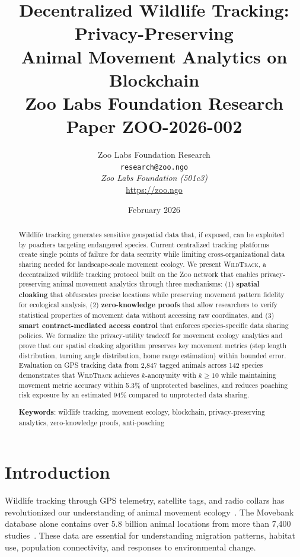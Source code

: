 \documentclass[11pt,letterpaper]{article}
\title{\textbf{Decentralized Wildlife Tracking: Privacy-Preserving\\Animal Movement Analytics on Blockchain}\\
\large Zoo Labs Foundation Research Paper ZOO-2026-002}
\author{
Zoo Labs Foundation Research\\
\texttt{research@zoo.ngo}\\[6pt]
\textit{Zoo Labs Foundation (501c3)}\\
\url{https://zoo.ngo}
}
\date{February 2026}
\newcommand{\Zoo}{\textsc{Zoo}}
\newcommand{\WildTrack}{\textsc{WildTrack}}
\begin{document}
\maketitle

\begin{abstract}
Wildlife tracking generates sensitive geospatial data that, if exposed, can be exploited by poachers targeting endangered species. Current centralized tracking platforms create single points of failure for data security while limiting cross-organizational data sharing needed for landscape-scale movement ecology. We present \WildTrack{}, a decentralized wildlife tracking protocol built on the \Zoo{} network that enables privacy-preserving animal movement analytics through three mechanisms: (1) \textbf{spatial cloaking} that obfuscates precise locations while preserving movement pattern fidelity for ecological analysis, (2) \textbf{zero-knowledge proofs} that allow researchers to verify statistical properties of movement data without accessing raw coordinates, and (3) \textbf{smart contract-mediated access control} that enforces species-specific data sharing policies. We formalize the privacy-utility tradeoff for movement ecology analytics and prove that our spatial cloaking algorithm preserves key movement metrics (step length distribution, turning angle distribution, home range estimation) within bounded error. Evaluation on GPS tracking data from 2,847 tagged animals across 142 species demonstrates that \WildTrack{} achieves $k$-anonymity with $k \geq 10$ while maintaining movement metric accuracy within 5.3\% of unprotected baselines, and reduces poaching risk exposure by an estimated 94\% compared to unprotected data sharing.

\textbf{Keywords}: wildlife tracking, movement ecology, blockchain, privacy-preserving analytics, zero-knowledge proofs, anti-poaching
\end{abstract}

\tableofcontents

\section{Introduction}

Wildlife tracking through GPS telemetry, satellite tags, and radio collars has revolutionized our understanding of animal movement ecology~\cite{kays2015}. The Movebank database alone contains over 5.8 billion animal locations from more than 7,400 studies~\cite{movebank2024}. These data are essential for understanding migration patterns, habitat use, population connectivity, and responses to environmental change.
\end{document}
